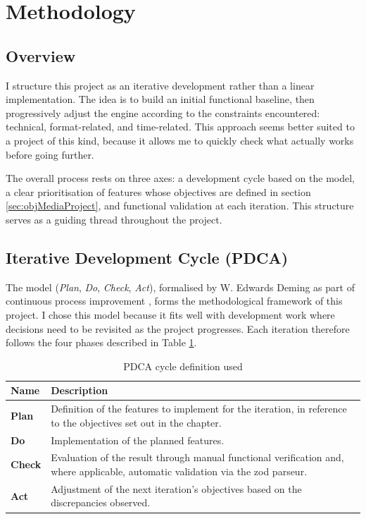 \section{Methodology}
\label{chap:methodologie}

\subsection{Overview}

I structure this project as an iterative development rather than a linear implementation. The idea is to build an initial functional baseline, then progressively adjust the engine according to the constraints encountered: technical, format-related, and time-related. This approach seems better suited to a project of this kind, because it allows me to quickly check what actually works before going further.

The overall process rests on three axes: a development cycle based on the  model, a clear prioritisation of features whose objectives are defined in section \ref{sec:objMediaProject}, and functional validation at each iteration. This structure serves as a guiding thread throughout the project.


\subsection{Iterative Development Cycle (PDCA)} \label{sec:PDCA}

The  model (\textit{Plan}, \textit{Do}, \textit{Check}, \textit{Act}), formalised by W. Edwards Deming as part of continuous process improvement \parencite{deming_out_1986}, forms the methodological framework of this project. I chose this model because it fits well with development work where decisions need to be revisited as the project progresses. Each iteration therefore follows the four phases described in Table \ref{tab:defPDCA}.

\begin{table}[H]
    \centering
    \caption{PDCA cycle definition used}
    \renewcommand{\arraystretch}{1.5}
    \begin{tabular}{p{1.5cm} p{11cm}}
        \hline
        \textbf{Name} & \textbf{Description} \\
        \hline
        \textbf{Plan} & Definition of the features to implement for the iteration, in reference to the objectives set out in the chapter. \\
        \addlinespace
        \textbf{Do} & Implementation of the planned features. \\
        \addlinespace
        \textbf{Check} & Evaluation of the result through manual functional verification and, where applicable, automatic validation via the \gls{zod} \gls{parseur}. \\
        \addlinespace
        \textbf{Act} & Adjustment of the next iteration's objectives based on the discrepancies observed. \\
        \hline
    \end{tabular}
    \label{tab:defPDCA}
\end{table}

